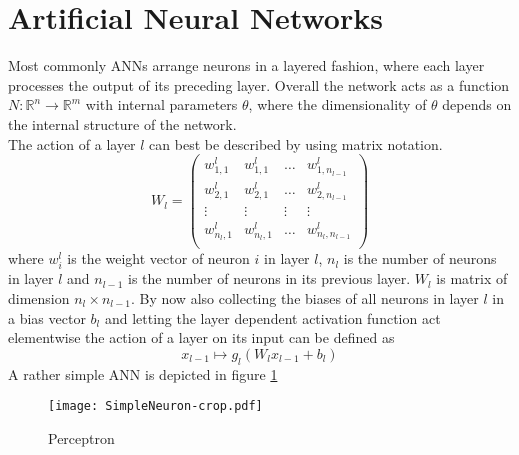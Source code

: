 \section{Artificial Neural Networks}
\label{sec:ANN}
Most commonly ANNs arrange neurons in a layered fashion, where each layer processes the output of its preceding layer. Overall the network acts as a function $N: \mathbb{R}^n \rightarrow \mathbb{R}^m$ with internal parameters $\theta$, where the dimensionality of $\theta$ depends on the internal structure of the network.\\
The action of a layer $l$ can best be described by using matrix notation. 
\begin{equation}
W_l = 
\begin{pmatrix}
w_{1,1}^l & w_{1,1}^l & \dots & w_{1,n_{l-1}}^l \\
w_{2,1}^l & w_{2,1}^l & \dots & w_{2,n_{l-1}}^l \\
\vdots & \vdots & \vdots & \vdots \\
w_{n_l,1}^l & w_{n_l,1}^l & \dots & w_{n_l,n_{l-1}}^l \\
\end{pmatrix}
\end{equation}
where $w_i^l$ is the weight vector of neuron $i$ in layer $l$, $n_l$ is the number of neurons in layer $l$ and $n_{l-1}$ is the number of neurons in its previous layer. $W_l$ is matrix of dimension $n_l \times n_{l-1}$. By now also collecting the biases of all neurons in layer $l$ in a bias vector $b_l$ and letting the layer dependent activation function act elementwise the action of a layer on its input can be defined as
\begin{equation}
x_{l-1} \mapsto g_l(W_l x_{l-1} + b_l)
\end{equation}
A rather simple ANN is depicted in figure \ref{fig:ANN}
\begin{figure}
\centering
  \texttt{[image: SimpleNeuron-crop.pdf]}
  \caption{Perceptron}
  \label{fig:ANN}
\end{figure}


